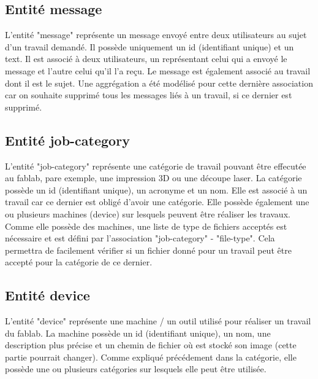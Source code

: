 \documentclass[
    iai, %
    il, %
]{heig-tb}
\begin{document}
\subsection{Entité message}
L'entité "message" représente un message envoyé entre deux utilisateurs au sujet d'un travail demandé.\newline
Il possède uniquement un id (identifiant unique) et un text.\newline
Il est associé à deux utilisateurs, un représentant celui qui a envoyé le message et l'autre celui qu'il l'a reçu. Le message est également associé au travail dont il est le sujet.\newline
Une aggrégation a été modélisé pour cette dernière association car on souhaite supprimé tous les messages liés à un travail, si ce dernier est supprimé.

\subsection{Entité job-category}
L'entité "job-category" représente une catégorie de travail pouvant être effecutée au fablab, pare exemple, une impression 3D ou une découpe laser.\newline
La catégorie possède un id (identifiant unique), un acronyme et un nom.\newline
Elle est associé à un travail car ce dernier est obligé d'avoir une catégorie.\newline
Elle possède également une ou plusieurs machines (device) sur lesquels peuvent être réaliser les travaux.\newline
Comme elle possède des machines, une liste de type de fichiers acceptés est nécessaire et est défini par l'association "job-category" - "file-type". Cela permettra de facilement vérifier si un fichier donné pour un travail peut être accepté pour la catégorie de ce dernier.

\subsection{Entité device}
L'entité "device" représente une machine / un outil utilisé pour réaliser un travail du fablab.\newline
La machine possède un id (identifiant unique), un nom, une description plus précise et un chemin de fichier où est stocké son image (cette partie pourrait changer).\newline
Comme expliqué précédement dans la catégorie, elle possède une ou plusieurs catégories sur lesquels elle peut être utilisée.\newline
\end{document}
